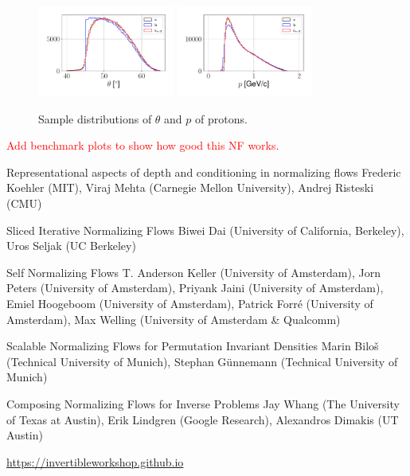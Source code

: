 \begin{figure}[htb]
\centering
\includegraphics[width = 0.4\textwidth]{Chapters/Ch3-Simulations/normalizing_flows/pics/MeetingFigures/Sangbaek/theta.pdf}
\includegraphics[width = 0.4\textwidth]{Chapters/Ch3-Simulations/normalizing_flows/pics/MeetingFigures/Sangbaek/momentum.pdf}
\label{fig: jul8_direct2}
\caption{Sample distributions of $\theta$ and $p$ of protons.}
\end{figure}

\textcolor{red}{Add benchmark plots to show how good this NF works.}


Representational aspects of depth and conditioning in normalizing flows
Frederic Koehler (MIT), Viraj Mehta (Carnegie Mellon University), Andrej Risteski (CMU)

Sliced Iterative Normalizing Flows
Biwei Dai (University of California, Berkeley), Uros Seljak (UC Berkeley)

Self Normalizing Flows
T. Anderson Keller (University of Amsterdam), Jorn Peters (University of Amsterdam), Priyank Jaini (University of Amsterdam), Emiel Hoogeboom (University of Amsterdam), Patrick Forré (University of Amsterdam), Max Welling (University of Amsterdam \& Qualcomm)

Scalable Normalizing Flows for Permutation Invariant Densities
Marin Biloš (Technical University of Munich), Stephan Günnemann (Technical University of Munich)

Composing Normalizing Flows for Inverse Problems
Jay Whang (The University of Texas at Austin), Erik Lindgren (Google Research), Alexandros Dimakis (UT Austin)

\url{https://invertibleworkshop.github.io}


